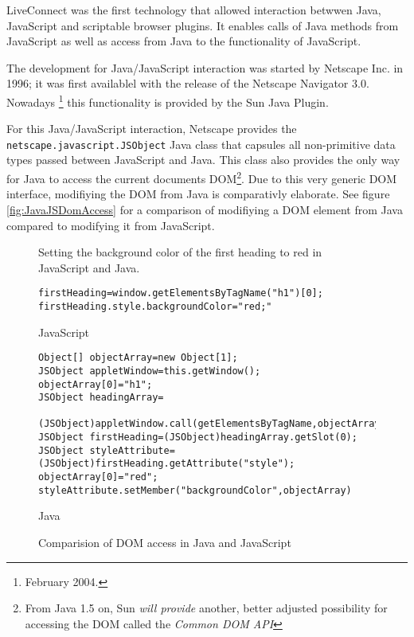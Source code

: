 LiveConnect was the first technology that allowed interaction betwwen Java, JavaScript and scriptable browser plugins. It enables calls of Java methods from JavaScript as well as access from Java to the functionality of JavaScript.

The development for Java/JavaScript interaction was started by Netscape Inc. in 1996; it was first availablel with the release of the Netscape Navigator 3.0. Nowadays \footnote{February 2004.} this functionality is provided by the Sun Java Plugin.

For this Java/JavaScript interaction, Netscape provides the \texttt{netscape.javascript.JSObject} Java class that capsules all non-primitive data types passed between JavaScript and Java. This class also provides the only way for Java to access the current documents DOM\footnote{From Java 1.5 on, Sun \emph{will provide} another, better adjusted possibility for accessing the DOM called the \emph{Common DOM API}}. Due to this very generic DOM interface, modifiying the DOM from Java is comparativly elaborate. See figure \ref{fig:JavaJSDomAccess} for a comparison of modifiying a DOM element from Java compared to modifying it from JavaScript.

\begin{figure}[htbp]
Setting the background color of the first heading to red in JavaScript and Java.	
\begin{verbatim}
firstHeading=window.getElementsByTagName("h1")[0];
firstHeading.style.backgroundColor="red;"
\end{verbatim}
JavaScript

\begin{verbatim}
Object[] objectArray=new Object[1];
JSObject appletWindow=this.getWindow();
objectArray[0]="h1";
JSObject headingArray=
  (JSObject)appletWindow.call(getElementsByTagName,objectArray);
JSObject firstHeading=(JSObject)headingArray.getSlot(0);
JSObject styleAttribute=(JSObject)firstHeading.getAttribute("style");
objectArray[0]="red";
styleAttribute.setMember("backgroundColor",objectArray)
\end{verbatim}
Java

	\caption{Comparision of DOM access in Java and JavaScript}
	\label{fig:ComparisionOfDOMAccessInJavaAndJavaScript}
\end{figure}
